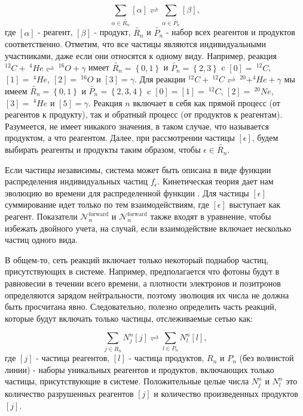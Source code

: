 \documentclass[14pt, a4paper]{article}
\numberwithin{figure}{section}
\numberwithin{equation}{section}
\begin{document}
$$
\sum_{\alpha \in \tilde{R_n}} [\alpha] \rightleftharpoons \sum_{\alpha \in \tilde{P_n}} [\beta],
$$
где $[\alpha]$ - реагент, $[\beta]$ - продукт, $\tilde{R_n}$ и $\tilde{P_n}$ - набор всех реагентов и продуктов соответственно. Отметим, что все частицы являются индивидуальными участниками, даже если они относятся к одному виду. Например, реакция $^{12}C + \ ^{4}He \rightleftharpoons \ ^{16}O + \gamma$ имеет $\tilde{R_n} = \left\{0, 1\right\}$ и $\tilde{P_n} = \left\{2, 3\right\}$ c $[0] = \ ^{12}C$, $[1] = \ ^4He$, $[2] = \ ^{16}O$ и $[3] = \gamma$. Для реакции $^{12}C + \ ^{12}C \rightleftharpoons \ ^{20} + ^{4}He + \gamma$ мы имеем $\tilde{R_n} = \left\{0, 1\right\}$ и $\tilde{P_n} = \left\{2, 3, 4\right\}$ c $[0] = [1] = \ ^{12}C$, $[2] = \ ^{20}Ne$, $[3] = \ ^4He$ и $[5] = \gamma$. Реакция $n$ включает в себя как прямой процесс (от реагентов к продукту), так и обратный процесс (от продуктов к реагентам). Разумеется, не имеет никакого значения, в таком случае, что называется продуктом, а что реагентом. Далее, при рассмотрении частицы $[\epsilon]$, будем выбирать реагенты и продукты таким образом, чтобы $\epsilon \in \tilde{R_n}$.

Если частицы независимы, система может быть описана в виде функции распределения индивидуальных частиц $f_\epsilon$. Кинетическая теория дает нам эволюцию во времени для распределенной функции \cite{tt}. Для частицы $[\epsilon]$ суммирование идет только по тем взаимодействиям, где $[\epsilon]$ выступает как реагент. Показатели $\mathcal{N}_n^{\text{forward}}$ и $\mathcal{N}_n^{\text{forward}}$ также входят в уравнение, чтобы избежать двойного учета, на случай, если взаимодействие включает несколько частиц одного вида.

В общем-то, сеть реакций включает только некоторый поднабор частиц, присутствующих в системе. Например, предполагается что фотоны будут в равновесии в течении всего времени, а плотности электронов и позитронов определяются зарядом нейтральности, поэтому эволюция их числа не должна быть просчитана явно. Следовательно, полезно определить часть реакций, которые будут включать только частицы, отслеживаемые сетью как:

$$
\sum_{j \in R_n} N_j^n [j] \rightleftharpoons \sum_{l \in P_n} N_l^n [l],
$$	
где $[j]$ - частица реагентов, $[l]$ - частица продуктов, $R_n$ и $P_n$ (без волнистой линии) - наборы уникальных реагентов и продуктов, включающих только частицы, присутствующие в системе. Положительные целые числа $N_j^n$ и $N_l^n$ это количество разрушенных реагентов $[j]$ и количество произведенных продуктов $[j]$.
\end{document}
